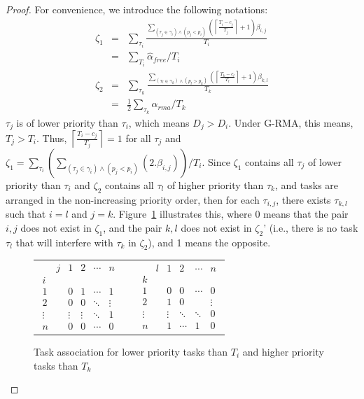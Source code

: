 \documentclass[letter]{sig-alternate}
\providecommand{\tabularnewline}{\\}
\begin{document}
\begin{proof}
For convenience, we introduce the following notations:
\begin{eqnarray}
\zeta_{1}& = & \sum_{\tau_{i}}\frac{\sum_{\left(\tau_{j}\in\gamma_{i}\right)\wedge\left(p_{j}<p_{i}\right)}\left(\left\lceil\frac{T_{i}-c_{j}}{T_{j}}\right\rceil+1\right)\beta_{i,j}}{T_{i}}\nonumber\\
& = & \sum_{T_i} \hat{\alpha}_{free}/T_i
\nonumber\\
\zeta_{2} 
& = & \sum_{\tau_{k}}\frac{\sum_{\left(\tau_{l}\in\gamma_{k}\right)\wedge\left(p_{l}>p_{k}\right)}\left(\left\lceil\frac{T_{k}-c_{l}}{T_{l}}\right\rceil+1\right)\beta_{k,l}}{T_{k}}\nonumber\\
& = & \frac{1}{2}\sum_{\tau_k} \alpha_{rma}/T_k\nonumber
\end{eqnarray}
$\tau_{j}$ is of lower priority than $\tau_{i}$, which means $D_{j}>D_{i}$. Under G-RMA, this means, $T_{j}>T_{i}$.
Thus, $\left\lceil\frac{T_{i}-c_{j}}{T_{j}}\right\rceil=1$ for
all $\tau_{j}$ and $\zeta_{1}=\sum_{\tau_{i}}(\sum_{(\tau_{j}\in\gamma_{i})\wedge(p_{j}<p_{i})}(2.\beta_{i,j}))/T_{i}$.
Since $\zeta_{1}$ contains all $\tau_{j}$ of lower priority than
$\tau_{i}$ and $\zeta_{2}$ contains all $\tau_{l}$ of higher priority than $\tau_{k}$, 
and tasks are arranged in the non-increasing priority order, then for each $\tau_{i,j}$, there exists $\tau_{k,l}$ such
that $i=l$ and $j=k$. Figure~\ref{fig:matrix-example} illustrates this, where 0 means that the pair $i,j$ 
does not exist in $\zeta_{1}$,
and the pair $k,l$ does not exist in $\zeta_{2}$' (i.e., 
there is no task $\tau_l$ that will interfere with $\tau_k$ in $\zeta_2$), 
and 1 means the opposite. 

\begin{figure}[htbp]
\begin{tabular}{ccc}
$\begin{array}{cccccc}
 & j & 1 & 2 & \cdots & n\\
i\\
1 &  & 0 & 1 & \cdots & 1\\
2 &  & 0 & 0 & \ddots & \vdots\\
\vdots &  & \vdots & \vdots & \ddots & 1\\
n &  & 0 & 0 & \cdots & 0\end{array}$ &  & $\begin{array}{cccccc}
 & l & 1 & 2 & \cdots & n\\
k\\
1 &  & 0 & 0 & \cdots & 0\\
2 &  & 1 & 0 &  & \vdots\\
\vdots &  & \vdots & \ddots & \ddots & 0\\
n &  & 1 & \cdots & 1 & 0\end{array}$\tabularnewline
\end{tabular}
\caption{\label{fig:matrix-example} Task association for lower priority tasks than $T_i$ and higher priority tasks than $T_k$}
\end{figure}



\end{proof}
\end{document}
